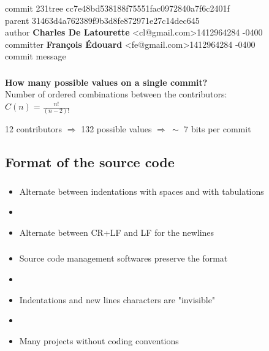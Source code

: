 \documentclass{beamer}
\begin{document}
\begin{frame}
  \frametitle{\insertsubsectionhead}
  \begin{small}
    commit 231tree cc7e48bd538188f75551fac0972840a7f6c2401f\\
    parent 31463d4a762389f9b3d8fe872971e27c14dec645\\
    author \textbf{Charles De Latourette} \textless cl@gmail.com\textgreater 1412964284 -0400\\
    committer \textbf{Fran\c{c}ois \'Edouard} \textless fe@gmail.com\textgreater 1412964284 -0400\\
    commit message
  \end{small}
\end{frame}

\begin{frame}
  \frametitle{\insertsubsectionhead}
  \textbf{How many possible values on a single commit?}\\
  Number of ordered combinations between the contributors:\\
  $C(n) = \frac{n!}{(n-2)!}$\\
  
  \medskip
  \medskip
  \medskip
  
  12 contributors $\Rightarrow$ 132 possible values $\Rightarrow\ \sim$ 7 bits per commit
\end{frame}


\subsection{Format of the source code}

\begin{frame}
  \frametitle{\insertsubsectionhead}
  \begin{itemize}
    \item Alternate between indentations with spaces and with tabulations
    \item []
    \item Alternate between CR+LF and LF for the newlines
  \end{itemize}
\end{frame}

\begin{frame}
  \frametitle{\insertsubsectionhead}
  \begin{itemize}
    \item Source code management softwares preserve the format
    \item []
    \item Indentations and new lines characters are "invisible"
    \item []
    \item Many projects without coding conventions
  \end{itemize}
\end{frame}
\end{document}
